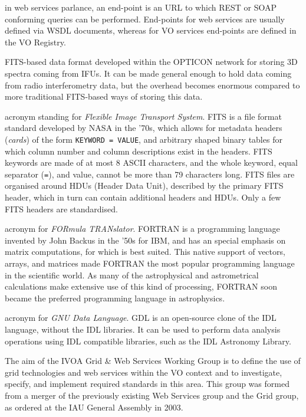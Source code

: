 {
    	in \gls{web services} parlance, an end-point is an \gls{URL} to
        which \gls{REST} or \gls{SOAP} conforming queries can be
        performed. End-points for web services are usually defined via
        \gls{WSDL} documents, whereas for \gls{VO} services end-points
        are defined in the VO \gls{Registry}.
}

{    	\gls{FITS}-based data format developed within the \gls{OPTICON}
        network for storing 3D spectra coming from \gls{IFU}s. It can
        be made general enough to hold data coming from radio
        interferometry data, but the overhead becomes enormous compared
        to more traditional FITS-based ways of storing this data.
}

{
    	acronym standing for \emph{Flexible Image Transport System}.
        FITS is a file format standard developed by NASA in the '70s,
        which allows for metadata headers (\emph{cards}) of the form
        \texttt{KEYWORD = VALUE}, and arbitrary shaped binary tables
        for which column number and column descriptions exist in the
        headers. FITS keywords are made of at most 8 ASCII characters,
        and the whole keyword, equal separator (\texttt{=}), and value,
        cannot be more than 79 characters long. FITS files are
        organised around HDUs (Header Data Unit), described by the
        primary FITS header, which in turn can contain additional
        headers and HDUs. Only a few FITS headers are standardised.
}

{
    	acronym for \emph{FORmula TRANslator}. FORTRAN is a programming
        language invented by John Backus in the '50s for IBM, and has
        an special emphasis on matrix computations, for which is best
        suited. This native support of vectors, arrays, and matrices
        made FORTRAN the most popular programming language in the
        scientific world. As many of the astrophysical and
        astrometrical calculations make extensive use of this kind of
        processing, FORTRAN soon became the preferred programming
        language in astrophysics.
}

{
    	acronym for \emph{GNU Data Language}. GDL is an
        \gls{open-source} clone of the \gls{IDL} language, without the
        IDL libraries. It can be used to perform data analysis
        operations using IDL compatible libraries, such as the \gls{IDL
        Astronomy Library}.
}

{
    	The aim of the \gls{IVOA} Grid & Web Services Working Group is
        to define the use of \gls{grid} technologies and \gls{web
        services} within the VO context and to investigate, specify,
        and implement required standards in this area. This group was
        formed from a merger of the previously existing Web Services
        group and the Grid group, as ordered at the IAU General
        Assembly in 2003.
}

